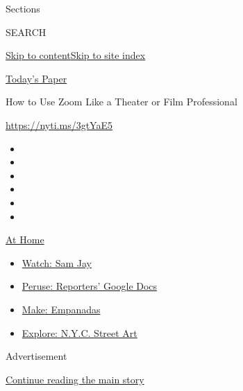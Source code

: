 Sections

SEARCH

\protect\hyperlink{site-content}{Skip to
content}\protect\hyperlink{site-index}{Skip to site index}

\href{https://myaccount.nytimes.com/auth/login?response_type=cookie\&client_id=vi}{}

\href{https://www.nytimes.com/section/todayspaper}{Today's Paper}

How to Use Zoom Like a Theater or Film Professional

\href{https://nyti.ms/3gtYaE5}{https://nyti.ms/3gtYaE5}

\begin{itemize}
\item
\item
\item
\item
\item
\item
\end{itemize}

\href{https://www.nytimes.com/spotlight/at-home?action=click\&pgtype=Article\&state=default\&region=TOP_BANNER\&context=at_home_menu}{At
Home}

\begin{itemize}
\tightlist
\item
  \href{https://www.nytimes.com/2020/08/04/arts/television/sam-jay-netflix-special.html?action=click\&pgtype=Article\&state=default\&region=TOP_BANNER\&context=at_home_menu}{Watch:
  Sam Jay}
\item
  \href{https://www.nytimes.com/interactive/2020/at-home/even-more-reporters-editors-diaries-lists-recommendations.html?action=click\&pgtype=Article\&state=default\&region=TOP_BANNER\&context=at_home_menu}{Peruse:
  Reporters' Google Docs}
\item
  \href{https://www.nytimes.com/2020/08/04/dining/colombian-empanadas-carlos-gaviria.html?action=click\&pgtype=Article\&state=default\&region=TOP_BANNER\&context=at_home_menu}{Make:
  Empanadas}
\item
  \href{https://www.nytimes.com/2020/08/06/arts/design/street-art-nyc-george-floyd.html?action=click\&pgtype=Article\&state=default\&region=TOP_BANNER\&context=at_home_menu}{Explore:
  N.Y.C. Street Art}
\end{itemize}

Advertisement

\protect\hyperlink{after-top}{Continue reading the main story}

